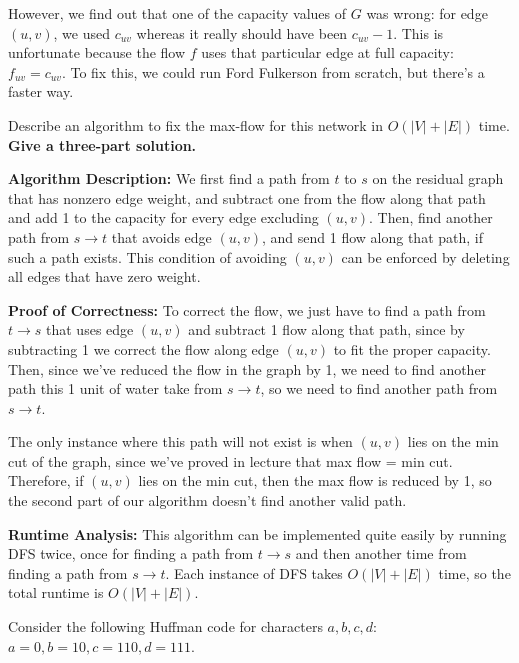 \documentclass[11pt]{article}
\begin{document}
\begin{subparts}
However, we find out that one of the capacity values of $G$ was wrong: for edge $(u, v)$, we used $c_{uv}$ whereas it really should have been $c_{uv} - 1$.
This is unfortunate because the flow $f$ uses that particular edge at full capacity: $f_{uv} = c_{uv}$.
To fix this, we could run Ford Fulkerson from scratch, but there's a faster way.

Describe an algorithm to fix the max-flow for this network in $O(|V|+|E|)$ time. \textbf{Give a three-part solution.}

\begin{solution}

	\textbf{Algorithm Description:} We first find a path from \(t\) to \(s\) on the residual graph
	that has nonzero edge weight, and 
	subtract one from the flow along that path and add 1 to the capacity for every edge excluding \((u, v)\). 
	Then, find another path from \(s \to t\) that avoids 
	edge \((u, v)\), and send 1 flow along that path, if such a path exists. This condition of avoiding 
	\((u, v)\) can be enforced by deleting all edges that have zero weight. 

	\textbf{Proof of Correctness:} To correct the flow, we just have to find a path from \(t \to s\) that uses 
	edge \((u, v)\) and subtract 1 flow along that path, since by subtracting 1 we correct the flow along 
	edge \((u, v)\) to fit the proper capacity. Then, since we've reduced the flow in the graph by 1, we need to 
	find another path this 1 unit of water take from \(s \to t\), so we need to find another path from 
	\(s \to t\). 

	The only instance where this path will not exist is when \((u, v)\) lies on the min cut of the graph, 
	since we've proved in lecture that max flow = min cut. Therefore, if \((u, v)\) lies on the 
	min cut, then the max flow is reduced by 1, so the second part of our algorithm doesn't find 
	another valid path. 

	\textbf{Runtime Analysis:} This algorithm can be implemented quite easily by running DFS twice, once 
	for finding a path from \(t\to s\) and then another time from finding a path from \(s \to t\). Each 
	instance of DFS takes \(O(|V| + |E|)\) time, so the total runtime is \(O(|V| + |E|)\).
\end{solution}
\end{subparts}

\newpage


Consider the following Huffman code for characters $a, b, c, d$: $a = 0, b = 10, c = 110, d = 111$. 
\end{document}
